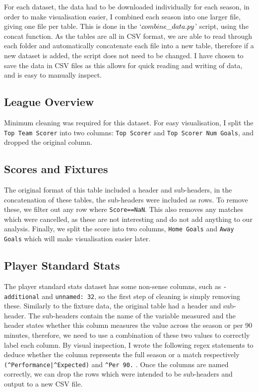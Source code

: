 \documentclass[12pt, a4paper, twocolumn]{article}
\begin{document}
For each dataset, the data had to be downloaded individually for each season, in order to make visualisation easier, I combined each season into one larger file, giving one file per table. This is done in the $`combine\_data.py$' script, using the concat function. As the tables are all in CSV format, we are able to read through each folder and automatically concatenate each file into a new table, therefore if a new dataset is added, the script does not need to be changed. I have chosen to save the data in CSV files as this allows for quick reading and writing of data, and is easy to manually inspect.

\subsection{League Overview}

Minimum cleaning was required for this dataset. For easy visualisation, I split the \verb|Top Team Scorer| into two columns: \verb|Top Scorer| and \verb|Top Scorer Num Goals|, and dropped the original column.

\subsection{Scores and Fixtures}

The original format of this table included a header and sub-headers, in the concatenation of these tables, the sub-headers were included as rows. To remove these, we filter out any row where \verb|Score==NaN|. This also removes any matches which were cancelled, as these are not interesting and do not add anything to our analysis. Finally, we split the score into two columns, \verb|Home Goals| and \verb|Away Goals| which will make visualisation easier later.

\subsection{Player Standard Stats}

The player standard stats dataset has some non-sense columns, such as \verb|-additional| and \verb|unnamed: 32|, so the first step of cleaning is simply removing these. Similarly to the fixture data, the original table had a header and sub-header. The sub-headers contain the name of the variable measured and the header states whether this column measures the value across the season or per 90 minutes, therefore, we need to use a combination of these two values to correctly label each column. By visual inspection, I wrote the following regex statements to deduce whether the column represents the full season or a match respectively \verb=(^Performance|^Expected)= and \verb=^Per 90.= . Once the columns are named correctly, we can drop the rows which were intended to be sub-headers and output to a new CSV file.
\end{document}
